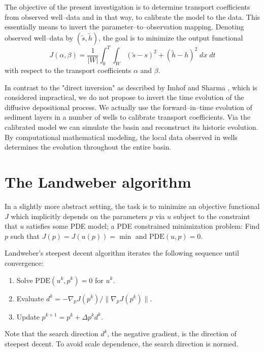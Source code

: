 The objective of the present investigation is to 
determine transport coefficients from observed well--data
and in that way, to calibrate the model to the data.
This essentially means to invert the parameter--to--observation mapping.
Denoting observed well--data by $(\widetilde s,\widetilde h)$, 
the goal is to minimize the output functional
\begin{equation} \label{output}
 J(\alpha, \beta) = 
 \frac{1}{|W|} \int_0^T \int_W (\widetilde s - s)^2 + (\widetilde h - h)^2 \; dx \; dt
\end{equation}
with respect to the transport coefficients $\alpha$ and $\beta$.

In contrast to the "direct inversion" as described by Imhof and Sharma \cite{ImhSha07},
which is considered impractical, 
we do not propose to invert the time evolution of the diffusive depositional process.
We actually use the forward--in--time evolution of sediment layers in a number of wells
to calibrate transport coefficients. 
Via the calibrated model we can simulate the basin and reconstruct its historic evolution.
By computational mathematical modeling, 
the local data observed in wells determines the evolution throughout the entire basin.

\section{The Landweber algorithm}

In a slightly more abstract setting, 
the task is to minimize an objective functional $J$ 
which implicitly depends on the parameters $p$ via $u$
subject to the constraint that $u$ satisfies some PDE model;
a PDE constrained minimization problem:
Find $p$ such that $J(p)=J(u(p))=\min$ and $\mathrm{PDE}(u,p)=0$.
\goodbreak

Landweber's steepest decent algorithm \cite{Lan51} iterates the following sequence until convergence:
\goodbreak

\begin{enumerate}
\item Solve $\mathrm{PDE}(u^k,p^k)=0$ for $u^k$.
\item Evaluate $d^k=-\nabla_pJ(p^k) / \| \nabla_pJ(p^k) \|$.
\item Update $p^{k+1}=p^k+\Delta p^k d^k$.
\end{enumerate}
\goodbreak

Note that the search direction $d^k$, the negative gradient, is the direction of steepest decent.
To avoid scale dependence, the search direction is normed.

